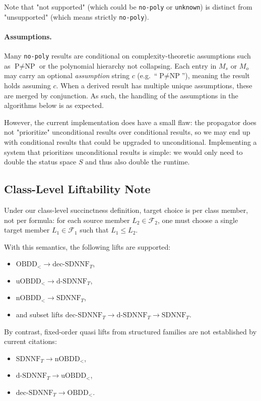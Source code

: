 \documentclass[10pt]{article}
\theoremstyle{plain}
\theoremstyle{definition}
\theoremstyle{remark}
\begin{document}
Note that "not supported" (which could be \texttt{no-poly} or \texttt{unknown}) is distinct from "unsupported" (which means strictly \texttt{no-poly}).

\paragraph{Assumptions.}
Many \texttt{no-poly} results are conditional on complexity-theoretic assumptions such as $\text{P} \neq \text{NP}$ or the polynomial hierarchy not collapsing. Each entry in $M_s$ or $M_o$ may carry an optional \emph{assumption} string $c$ (e.g.\ ``$\text{P} \neq \text{NP}$''), meaning the result holds assuming $c$. When a derived result has multiple unique assumptions, these are merged by conjunction. As such, the handling of the assumptions in the algorithms below is as expected. 

However, the current implementation does have a small flaw: the propagator does not "prioritize" unconditional results over conditional results, so we may end up with conditional results that could be upgraded to unconditional. Implementing a system that prioritizes unconditional results is simple: we would only need to double the status space $S$ and thus also double the runtime.


\subsection{Class-Level Liftability Note}
Under our class-level succinctness definition, target choice is per class member, not per formula:
for each source member $L_2 \in \mathcal{F}_2$, one must choose a single target member
$L_1 \in \mathcal{F}_1$ such that $L_1 \leq L_2$.

With this semantics, the following lifts are supported:
\begin{itemize}
  \item $\text{OBDD}_{<} \to \text{dec-SDNNF}_T$,
  \item $\text{uOBDD}_{<} \to \text{d-SDNNF}_T$,
  \item $\text{nOBDD}_{<} \to \text{SDNNF}_T$,
  \item and subset lifts $\text{dec-SDNNF}_T \to \text{d-SDNNF}_T \to \text{SDNNF}_T$.
\end{itemize}

By contrast, fixed-order quasi lifts from structured families are not established by current citations:
\begin{itemize}
  \item $\text{SDNNF}_T \to \text{nOBDD}_{<}$,
  \item $\text{d-SDNNF}_T \to \text{uOBDD}_{<}$,
  \item $\text{dec-SDNNF}_T \to \text{OBDD}_{<}$.
\end{itemize}
\end{document}
